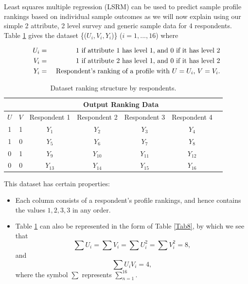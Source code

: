 \documentclass[a4paper, 12pt]{article}
\begin{document}
Least squares multiple regression (LSRM) can be used to predict sample profile rankings based on individual sample outcomes as we will now explain using our simple 2 attribute, 2 level survey and generic sample data for 4 respondents. Table \ref{Tab7} gives the dataset \{($U_i,V_i,Y_i$)\} ($i = 1,...,16$) where

\begin{eqnarray*}
	U_i&=& 1 \textup{ if attribute 1 has level 1, and 0 if it has level 2}\\
	V_i&=& 1 \textup{ if attribute 2 has level 1, and 0 if it has level 2}\\
	Y_i&=& \textup{ Respondent's ranking of a profile with $U=U_i$, $V=V_i$.}
\end{eqnarray*}

\begin{table}[!htpb]
	\centering
	\small
	\begin{tabular}{cc|ccccc}
		\multicolumn{2}{c}{} &\multicolumn{4}{c}{Output Ranking Data}\\\hline
		$U$ & $V$ & Respondent 1&  Respondent 2& Respondent 3& Respondent 4\\  \hline
		1 &1&$Y_1$&$Y_2$&$Y_3$&$Y_4$\\
		1 &0&$Y_5$&$Y_6$&$Y_7$&$Y_8$ \\
		0 &1&$Y_9$&$Y_{10}$&$Y_{11}$&$Y_{12}$ \\
		0 &0&$Y_{13}$&$Y_{14}$&$Y_{15}$&$Y_{16}$ \\\hline
	\end{tabular}
	\caption{{\small Dataset ranking structure by respondents.}}
	\label{Tab7}
\end{table}


This dataset has certain properties:
\begin{itemize}
	\item
	Each column consists of a respondent's profile rankings, and hence contains the values $1, 2, 3, 3$ in any order.
	
	\item
	Table \ref{Tab7} can also be represented in the form of Table \ref{Tab8}, by which we see that $$\sum U_i = \sum V_i = \sum U_i^2 = \sum V_i^2= 8, $$ and $$ \sum U_iV_i = 4,$$ where the symbol $\sum $ represents $\displaystyle \sum_{n=1}^{16}$.
\end{itemize}
\end{document}
